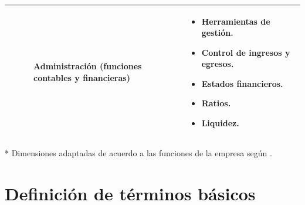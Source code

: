 \begin{table}
\begin{tabular}{|p{3cm}|p{4cm}|p{3.5cm}|p{3.5cm}|p{5cm}|}
     &  &  & Administración (funciones contables y financieras) &
     \begin{itemize}[noitemsep]
       \item Herramientas de gestión.
       \item Control de ingresos y egresos.
       \item Estados financieros.
       \item Ratios.
       \item Liquidez.
     \end{itemize} \\ \hline
    \end{tabular}
    * Dimensiones adaptadas de acuerdo a las funciones de la empresa según \cite{fayol}.
\end{table}

\newpage
\section{Definici\'on de t\'erminos b\'asicos}
